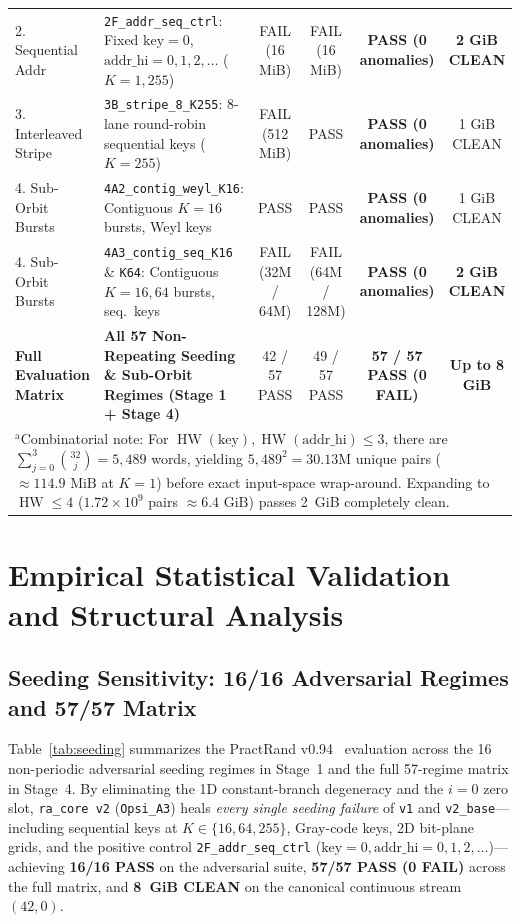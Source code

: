 \documentclass[conference]{IEEEtran}
\DeclareMathOperator{\HW}{HW}
\begin{document}
\begin{table}[t]
{\begin{tabular}{llcccc}
2. Sequential Addr & \texttt{2F\_addr\_seq\_ctrl}: Fixed $\text{key}=0$, $\text{addr\_hi} = 0, 1, 2, \dots$ ($K=1, 255$) & FAIL (16 MiB) & FAIL (16 MiB) & \textbf{PASS (0 anomalies)} & \textbf{2 GiB CLEAN} \\
3. Interleaved Stripe & \texttt{3B\_stripe\_8\_K255}: 8-lane round-robin sequential keys ($K=255$) & FAIL (512 MiB) & PASS & \textbf{PASS (0 anomalies)} & 1 GiB CLEAN \\
4. Sub-Orbit Bursts & \texttt{4A2\_contig\_weyl\_K16}: Contiguous $K=16$ bursts, Weyl keys & PASS & PASS & \textbf{PASS (0 anomalies)} & 1 GiB CLEAN \\
4. Sub-Orbit Bursts & \texttt{4A3\_contig\_seq\_K16} \& \texttt{K64}: Contiguous $K=16, 64$ bursts, seq.\ keys & FAIL (32M / 64M) & FAIL (64M / 128M) & \textbf{PASS (0 anomalies)} & \textbf{2 GiB CLEAN} \\
\midrule
\textbf{Full Evaluation Matrix} & \textbf{All 57 Non-Repeating Seeding \& Sub-Orbit Regimes (Stage 1 + Stage 4)} & 42 / 57 PASS & 49 / 57 PASS & \textbf{57 / 57 PASS (0 FAIL)} & \textbf{Up to 8 GiB} \\
\bottomrule
\multicolumn{6}{l}{\footnotesize $^{\mathrm{a}}$Combinatorial note: For $\HW(\text{key}), \HW(\text{addr\_hi}) \le 3$, there are $\sum_{j=0}^3 \binom{32}{j} = 5{,}489$ words, yielding $5{,}489^2 = 30.13\text{M}$ unique pairs ($\approx 114.9\text{ MiB}$ at $K=1$) before exact input-space wrap-around. Expanding to $\HW \le 4$ ($1.72 \times 10^9$ pairs $\approx 6.4\text{ GiB}$) passes 2~GiB completely clean.}
\end{tabular}%
}
\end{table}

\section{Empirical Statistical Validation and Structural Analysis}\label{sec:stats}

\subsection{Seeding Sensitivity: 16/16 Adversarial Regimes and 57/57 Matrix}

Table~\ref{tab:seeding} summarizes the PractRand v0.94~\cite{dotyhumphreypractrand} evaluation across the 16 non-periodic adversarial seeding regimes in Stage~1 and the full 57-regime matrix in Stage~4. By eliminating the 1D constant-branch degeneracy and the $i=0$ zero slot, \texttt{ra\_core v2} (\texttt{Opsi\_A3}) heals \emph{every single seeding failure} of \texttt{v1} and \texttt{v2\_base}---including sequential keys at $K \in \{16, 64, 255\}$, Gray-code keys, 2D bit-plane grids, and the positive control \texttt{2F\_addr\_seq\_ctrl} ($\text{key}=0, \text{addr\_hi}=0, 1, 2, \dots$)---achieving \textbf{16/16 PASS} on the adversarial suite, \textbf{57/57 PASS (0 FAIL)} across the full matrix, and \textbf{8~GiB CLEAN} on the canonical continuous stream $(42, 0)$.
\end{document}
